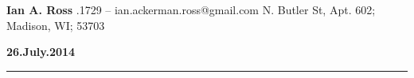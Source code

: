 \documentclass[11pt]{letter} %
\def\today{
  \textcolor[rgb]{0.188,0.337,0.549}{\large{\bf 26.July.2014}}
  \hrule
}
\begin{document}

\begin{letter}{}


\begin{center}
    {\Large\bf Ian A. Ross} %
    \smallskip{}.1729 -- ian.ackerman.ross@gmail.com
    \smallskip{} N. Butler St, Apt. 602; Madison, WI; 53703
\end{center} 

\signature{Ian Ross} %


\today
\vspace{5 mm}
 

 

\content





\end{letter}
\end{document}
